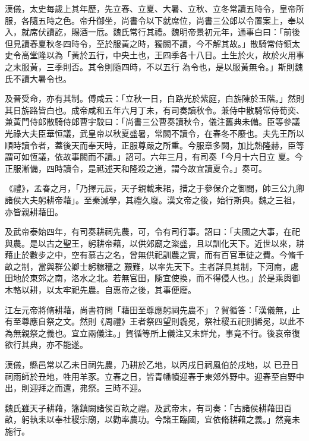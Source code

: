 \begin{pinyinscope}
 漢儀，太史每歲上其年歷，先立春、立夏、大暑、立秋、立冬常讀五時令，皇帝所服，各隨五時之色。帝升御坐，尚書令以下就席位，尚書三公郎以令置案上，奉以入，就席伏讀訖，賜酒一卮。魏氏常行其禮。魏明帝景初元年，通事白曰：「前後但見讀春夏秋冬四時令，至於服黃之時，獨闕不讀，今不解其故。」散騎常侍領太史令高堂隆以為「黃於五行，中央土也，王四季各十八日。土生於火，故於火用事之末服黃，三季則否。其令則隨四時，不以五行
 為令也，是以服黃無令。」斯則魏氏不讀大暑令也。



 及晉受命，亦有其制。傅咸云：「立秋一日，白路光於紫庭，白旂陳於玉階。」然則其日旂路皆白也。成帝咸和五年六月丁未，有司奏讀秋令。兼侍中散騎常侍荀奕、兼黃門侍郎散騎侍郎曹宇駮曰：「尚書三公曹奏讀秋令，儀注舊典未備。臣等參議光祿大夫臣華恒議，武皇帝以秋夏盛暑，常闕不讀令，在春冬不廢也。夫先王所以順時讀令者，蓋後天而奉天時，正服尊嚴之所重。今服章多闕，加比熱隆赫，臣等謂可如恆議，依故事闕而不讀。」詔可。六年三月，有司奏「今月十六日立
 夏。今正服漸備，四時讀令，是祗述天和隆殺之道，謂今故宜讀夏令。」奏可。



 《禮》，孟春之月，「乃擇元辰，天子親載耒耜，措之于參保介之御間，帥三公九卿諸侯大夫躬耕帝藉」。至秦滅學，其禮久廢。漢文帝之後，始行斯典。魏之三祖，亦皆親耕藉田。



 及武帝泰始四年，有司奏耕祠先農，可，令有司行事。詔曰：「夫國之大事，在祀與農。是以古之聖王，躬耕帝藉，以供郊廟之粢盛，且以訓化天下。近世以來，耕藉止於數步之中，空有慕古之名，曾無供祀訓農之實，而有百官車徒之費。今脩千畝之制，當與群公卿士躬稼穡之
 艱難，以率先天下。主者詳具其制，下河南，處田地於東郊之南，洛水之北。若無官田，隨宜使換，而不得侵人也。」於是乘輿御木輅以耕，以太牢祀先農。自惠帝之後，其事便廢。



 江左元帝將脩耕藉，尚書符問「藉田至尊應躬祠先農不」？賀循答：「漢儀無，止有至尊應自祭之文。然則《周禮》王者祭四望則毳冕，祭社稷五祀則絺冕，以此不為無親祭之義也。宜立兩儀注。」賀循等所上儀注又未詳允，事竟不行。後哀帝復欲行其典，亦不能遂。



 漢儀，縣邑常以乙未日祠先農，乃耕於乙地，以丙戌日祠風伯於戌地，以
 已丑日祠雨師於丑地，牲用羊豕。立春之日，皆青幡幘迎春于東郊外野中。迎春至自野中出，則迎拜之而還，弗祭。三時不迎。



 魏氏雖天子耕藉，籓鎮闕諸侯百畝之禮。及武帝末，有司奏：「古諸侯耕藉田百畝，躬執耒以奉社稷宗廟，以勸率農功。今諸王臨國，宜依脩耕藉之義。」然竟未施行。




\end{pinyinscope}
